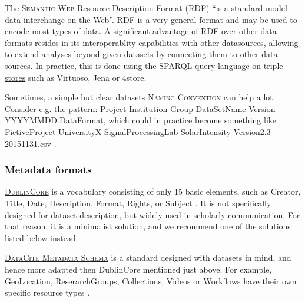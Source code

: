 \vspace{0.4cm}

\noindent The  \textsc{\href{http://www.w3.org/RDF/}{Semantic Web}} Resource Description Format (RDF) ``is a standard model data interchange on the Web''\cite{w3c_rdf_2014}. RDF is a very general format and may be used to encode most types of data. A significant advantage of RDF over other data formats resides in its interoperablity capabilities with other datasources, allowing to extend analyses beyond given datasets by connecting them to other data sources. In practice, this is done using the SPARQL query language on \href{http://www.w3.org/wiki/LargeTripleStores}{triple stores} such as Virtuoso, Jena or 4store.

\vspace{0.4cm}

\noindent Sometimes, a simple but clear datasets   \textsc{Naming Convention} can help a lot. Consider e.g. the pattern: Project-Institution-Group-DataSetName-Version-YYYYMMDD.DataFormat, which could in practice become something like FictiveProject-UniversityX-SignalProcessingLab-SolarIntensity-Version2.3-20151131.csv .

\subsubsection{Metadata formats}

\noindent {} \textsc{\href{http://dublincore.org/documents/dces/}{DublinCore}} is a vocabulary consisting of only 15 basic elements, such as Creator, Title, Date, Description, Format, Rights, or Subject \cite{dublincore_dublin_3013}. It is not specifically designed for dataset description, but widely used in scholarly communication. For that reason, it is a minimalist solution, and we recommend one of the solutions listed below instead. 

\vspace{0.4cm}

\noindent {} \textsc{\href{https://schema.datacite.org/}{DataCite Metadata Schema}} is a standard designed with datasets in mind, and hence more adapted then DublinCore mentioned just above. For example, GeoLocation, ReserarchGroups, Collections, Videos or Workflows have their own specific resource types \cite{datacite_datacite_2015}.

\vspace{0.4cm}

